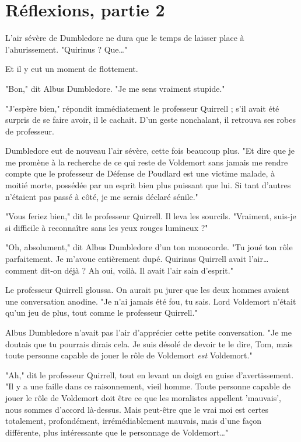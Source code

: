 
\chapter{Réflexions, partie 2}

L'air sévère de Dumbledore ne dura que le temps de laisser place à l'ahurissement. "Quirinus ? Que…"

Et il y eut un moment de flottement.

"Bon," dit Albus Dumbledore. "Je me sens vraiment stupide."

"J'espère bien," répondit immédiatement le professeur Quirrell ; s'il avait été surpris de se faire avoir, il le cachait. D'un geste nonchalant, il retrouva ses robes de professeur.

Dumbledore eut de nouveau l'air sévère, cette fois beaucoup plus. "Et dire que je me promène à la recherche de ce qui reste de Voldemort sans jamais me rendre compte que le professeur de Défense de Poudlard est une victime malade, à moitié morte, possédée par un esprit bien plus puissant que lui. Si tant d'autres n'étaient pas passé à côté, je me serais déclaré sénile."

"Vous feriez bien," dit le professeur Quirrell. Il leva les sourcils. "Vraiment, suis-je si difficile à reconnaître sans les yeux rouges lumineux ?"

"Oh, absolument," dit Albus Dumbledore d'un ton monocorde. "Tu joué ton rôle parfaitement. Je m'avoue entièrement dupé. Quirinus Quirrell avait l'air… comment dit-on déjà ? Ah oui, voilà. Il avait l'air sain d'esprit."

Le professeur Quirrell gloussa. On aurait pu jurer que les deux hommes avaient une conversation anodine. "Je n'ai jamais été fou, tu sais. Lord Voldemort n'était qu'un jeu de plus, tout comme le professeur Quirrell."

Albus Dumbledore n'avait pas l'air d'apprécier cette petite conversation. "Je me doutais que tu pourrais dirais cela. Je suis désolé de devoir te le dire, Tom, mais toute personne capable de jouer le rôle de Voldemort \emph{est}  Voldemort."

"Ah," dit le professeur Quirrell, tout en levant un doigt en guise d'avertissement. "Il y a une faille dans ce raisonnement, vieil homme. Toute personne capable de jouer le rôle de Voldemort doit être ce que les moralistes appellent 'mauvais', nous sommes d'accord là-dessus. Mais peut-être que le vrai moi est certes totalement, profondément, irrémédiablement mauvais, mais d'une façon différente, plus intéressante que le personnage de Voldemort…"

